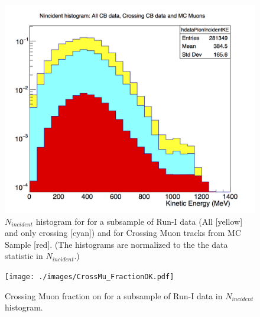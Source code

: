 \begin{figure}[h!]
\centering
\includegraphics[scale=0.5]{./images/CBAllandCross_CrossMuMC.png}
\caption{$N_{incident}$ histogram for for a subsample of Run-I data (All [yellow] and only crossing [cyan]) and for Crossing Muon tracks from MC Sample [red]. (The histograms are normalized to the the data statistic in $N_{incident}$.)}
\label{CrossingOBMuon}
\end{figure}

\begin{figure}[h!]
\centering
\texttt{[image: ./images/CrossMu\_FractionOK.pdf]}
\caption{Crossing Muon fraction on for a subsample of Run-I data in $N_{incident}$ histogram. }
\label{CrossingFraction}
\end{figure}